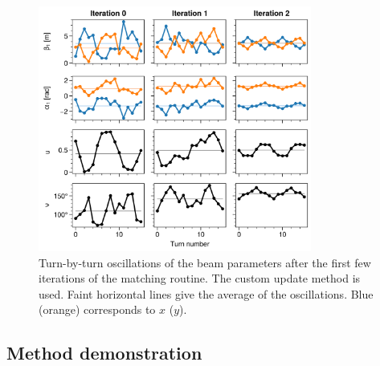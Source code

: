 \begin{figure}[!p]
    \centering
    \includegraphics[width=0.8\textwidth]{Images/chapter2/optimizer_iters.png}
    \caption{Turn-by-turn oscillations of the beam parameters after the first few iterations of the matching routine. The custom update method is used. Faint horizontal lines give the average of the oscillations. Blue (orange) corresponds to $x$ ($y$).}
    \label{fig:optimizer_iters}
\end{figure}








\subsection{Method demonstration}

